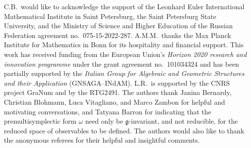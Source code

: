 \documentclass[pdftex]{sigma}
\numberwithin{equation}{section}
\newcommand{\g}{\mathfrak{g}}
\begin{document}
C.B.\ would like to acknowledge the support of the Leonhard Euler International Mathematical Institute in Saint Petersburg, the Saint Petersburg State University, and the Ministry of Science and Higher Education of the Russian Federation agreement no.~075-15-2022-287.
A.M.M.\ thanks the Max Planck Institute for Mathematics in Bonn for its hospitality and financial support.
This work has received funding from the European Union's \emph{Horizon 2020 research and innovation programme} under the grant agreement no.~101034324 and has been partially supported by the \emph{Italian Group for Algebraic and Geometric Structures and their Application} (GNSAGA–INdAM).
L.R.~is supported by the CNRS project GraNum and by the RTG2491.
The authors thank Janina Bernardy, Christian Blohmann, Luca Vitagliano, and Marco Zambon for helpful and motivating conversations, and Tatyana Barron for indicating that the premultisymplectic form $\omega$ need only be $\g$-invariant, and not reducible, for the reduced space of observables to be defined. The authors would also like to thank the anonymous referees for their helpful and insightful comments.

%
%
\end{document}
